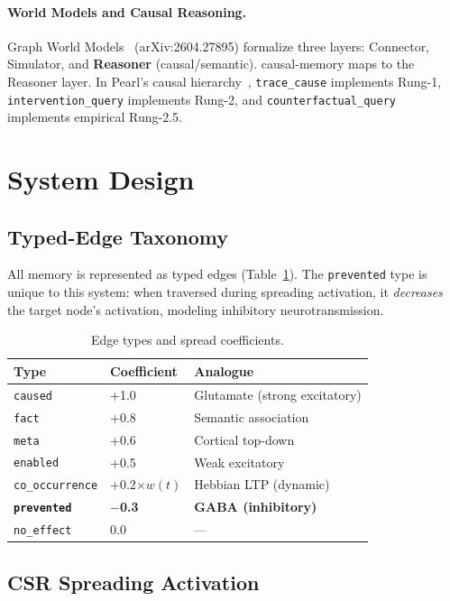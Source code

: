 \documentclass[letterpaper,twocolumn,10pt]{article}
\begin{document}
\paragraph{World Models and Causal Reasoning.}
Graph World Models~\cite{gwm} (arXiv:2604.27895) formalize three layers: Connector, Simulator, and \textbf{Reasoner} (causal/semantic). causal-memory maps to the Reasoner layer. In Pearl's causal hierarchy~\cite{pearl}, \texttt{trace\_cause} implements Rung-1, \texttt{intervention\_query} implements Rung-2, and \texttt{counterfactual\_query} implements empirical Rung-2.5.

\section{System Design}
\label{sec:design}

\subsection{Typed-Edge Taxonomy}

All memory is represented as typed edges (Table~\ref{tab:edges}). The \texttt{prevented} type is unique to this system: when traversed during spreading activation, it \emph{decreases} the target node's activation, modeling inhibitory neurotransmission.

\begin{table}[ht]
\centering
\small
\caption{Edge types and spread coefficients.}
\label{tab:edges}
\begin{tabular}{lll}
\toprule
Type & Coefficient & Analogue \\
\midrule
\texttt{caused} & +1.0 & Glutamate (strong excitatory) \\
\texttt{fact} & +0.8 & Semantic association \\
\texttt{meta} & +0.6 & Cortical top-down \\
\texttt{enabled} & +0.5 & Weak excitatory \\
\texttt{co\_occurrence} & +0.2$\times w(t)$ & Hebbian LTP (dynamic) \\
\textbf{\texttt{prevented}} & \textbf{$-$0.3} & \textbf{GABA (inhibitory)} \\
\texttt{no\_effect} & 0.0 & --- \\
\bottomrule
\end{tabular}
\end{table}

\subsection{CSR Spreading Activation}
\end{document}
